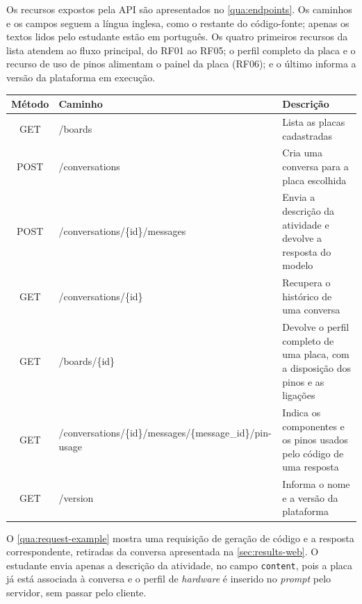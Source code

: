Os recursos expostos pela API são apresentados no \autoref{qua:endpoints}. Os caminhos e os campos seguem a língua inglesa, como o restante do código-fonte; apenas os textos lidos pelo estudante estão em português. Os quatro primeiros recursos da lista atendem ao fluxo principal, do RF01 ao RF05; o perfil completo da placa e o recurso de uso de pinos alimentam o painel da placa (RF06); e o último informa a versão da plataforma em execução.

\begin{quadro}[!htb]
  \centering
  \caption{Recursos expostos pela API}
  \label{qua:endpoints}
  \begin{tabularx}{\textwidth}{|c|>{\raggedright\arraybackslash}p{5.4cm}|X|}
    \hline
    \textbf{Método} & \textbf{Caminho} & \textbf{Descrição} \\
    \hline
    GET & /boards & Lista as placas cadastradas \\
    \hline
    POST & /conversations & Cria uma conversa para a placa escolhida \\
    \hline
    POST & /conversations/\{id\}/messages & Envia a descrição da atividade e devolve a resposta do modelo \\
    \hline
    GET & /conversations/\{id\} & Recupera o histórico de uma conversa \\
    \hline
    GET & /boards/\{id\} & Devolve o perfil completo de uma placa, com a disposição dos pinos e as ligações \\
    \hline
    GET & /conversations/\{id\}/messages/\newline\{message\_id\}/pin-usage & Indica os componentes e os pinos usados pelo código de uma resposta \\
    \hline
    GET & /version & Informa o nome e a versão da plataforma \\
    \hline
  \end{tabularx}
\end{quadro}

O \autoref{qua:request-example} mostra uma requisição de geração de código e a resposta correspondente, retiradas da conversa apresentada na \autoref{sec:results-web}. O estudante envia apenas a descrição da atividade, no campo \texttt{content}, pois a placa já está associada à conversa e o perfil de \textit{hardware} é inserido no \textit{prompt} pelo servidor, sem passar pelo cliente.

